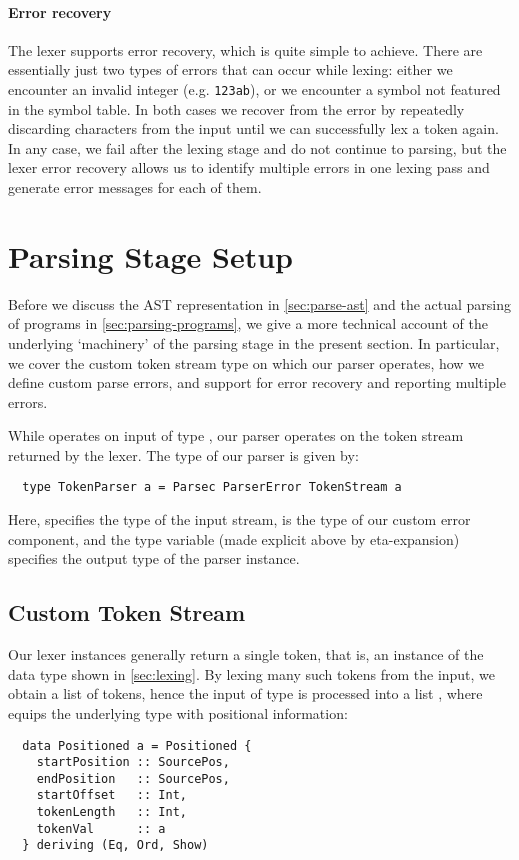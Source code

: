 \paragraph{Error recovery}
The lexer supports error recovery, which is quite simple to achieve.
There are essentially just two types of errors that can occur while lexing:
either we encounter an invalid integer (e.g. \verb|123ab|),
or we encounter a symbol not featured in the symbol table.
In both cases we recover from the error by repeatedly discarding characters from
the input until we can successfully lex a token again.
In any case, we fail after the lexing stage and do not continue to parsing, but
the lexer error recovery allows us to identify multiple errors in one lexing
pass and generate error messages for each of them.


\section{Parsing Stage Setup} \label{sec:parsing-setup}

Before we discuss the AST representation in \cref{sec:parse-ast} and the actual
parsing of programs in \cref{sec:parsing-programs}, we give a more technical
account of the underlying `machinery' of the parsing stage in the present
section. In particular, we cover the custom token stream type on which our
parser operates, how we define custom parse errors, and support for error
recovery and reporting multiple errors.

While  operates on input of type , our parser
 operates on the token stream returned by the lexer.
The type of our parser is given by:
%
\begin{verbatim}
  type TokenParser a = Parsec ParserError TokenStream a
\end{verbatim}
Here,  specifies the type of the input stream,
 is the type of our custom error component, and the type
variable  (made explicit above by eta-expansion) specifies the output
type of the parser instance.


\subsection{Custom Token Stream}

Our lexer instances generally return a single token, that is, an instance of
the  data type shown in \cref{sec:lexing}. By lexing many such
tokens from the input, we obtain a list of tokens, hence the input of type
 is processed into a list ,
where  equips the underlying type  with positional
information:
\begin{verbatim}
  data Positioned a = Positioned {
    startPosition :: SourcePos,
    endPosition   :: SourcePos,
    startOffset   :: Int,
    tokenLength   :: Int,
    tokenVal      :: a
  } deriving (Eq, Ord, Show)
\end{verbatim}


